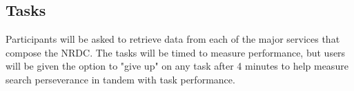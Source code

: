 \documentclass{article}
\begin{document}

%
\subsection{Tasks}
Participants will be asked to retrieve data from each of the major services that compose the NRDC. The tasks will be timed to measure performance, but users will be given the option to "give up" on any task after 4 minutes to help measure search perseverance in tandem with task performance.

\end{document}
